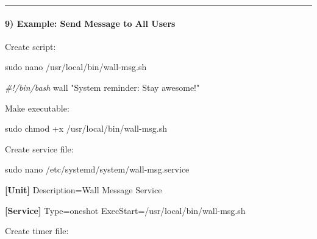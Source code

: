 \documentclass[
  english,
  paper=a4,
  oneside  ,captions=tableheading
]{scrartcl}
\newenvironment{Shaded}{}{}
\newcommand{\CommentTok}[1]{\textcolor[rgb]{0.38,0.63,0.69}{\textit{#1}}}
\newcommand{\DataTypeTok}[1]{\textcolor[rgb]{0.56,0.13,0.00}{#1}}
\newcommand{\FunctionTok}[1]{\textcolor[rgb]{0.02,0.16,0.49}{#1}}
\newcommand{\KeywordTok}[1]{\textcolor[rgb]{0.00,0.44,0.13}{\textbf{#1}}}
\newcommand{\NormalTok}[1]{#1}
\newcommand{\OtherTok}[1]{\textcolor[rgb]{0.00,0.44,0.13}{#1}}
\newcommand{\StringTok}[1]{\textcolor[rgb]{0.25,0.44,0.63}{#1}}
\begin{document}
\begin{center}\rule{0.5\linewidth}{0.5pt}\end{center}

\paragraph{9) Example: Send Message to All
Users}\label{example-send-message-to-all-users}

Create script:

\begin{Shaded}
\begin{Highlighting}[]
\FunctionTok{sudo}\NormalTok{ nano /usr/local/bin/wall{-}msg.sh}
\end{Highlighting}
\end{Shaded}

\begin{Shaded}
\begin{Highlighting}[]
\CommentTok{\#!/bin/bash}
\FunctionTok{wall} \StringTok{"System reminder: Stay awesome!"}
\end{Highlighting}
\end{Shaded}

Make executable:

\begin{Shaded}
\begin{Highlighting}[]
\FunctionTok{sudo}\NormalTok{ chmod +x /usr/local/bin/wall{-}msg.sh}
\end{Highlighting}
\end{Shaded}

Create service file:

\begin{Shaded}
\begin{Highlighting}[]
\FunctionTok{sudo}\NormalTok{ nano /etc/systemd/system/wall{-}msg.service}
\end{Highlighting}
\end{Shaded}

\begin{Shaded}
\begin{Highlighting}[]
\KeywordTok{[Unit]}
\DataTypeTok{Description}\OtherTok{=}\StringTok{Wall Message Service}

\KeywordTok{[Service]}
\DataTypeTok{Type}\OtherTok{=}\StringTok{oneshot}
\DataTypeTok{ExecStart}\OtherTok{=}\StringTok{/usr/local/bin/wall{-}msg.sh}
\end{Highlighting}
\end{Shaded}

Create timer file:
\end{document}
